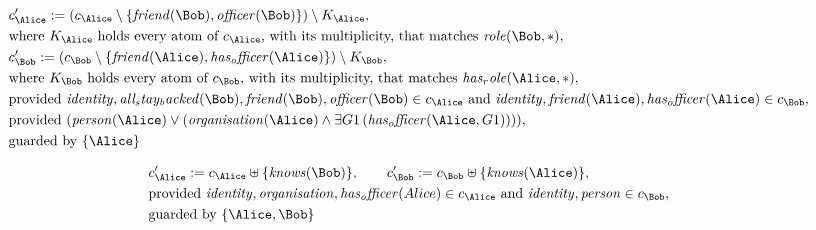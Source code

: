 \begin{align*}
&
c'_
{
\Alice
}
 := 
(c_
{
\Alice
}
 \setminus 
\{
\mathit{
friend
}
(
\Bob
)
,
\mathit{
officer
}
(
\Bob
)
\}
) \setminus K_
{
\Alice
}
,\\
&
\text{where } K_
{
\Alice
}
 \text{ holds every atom of } c_
{
\Alice
}
 \text{, with its multiplicity, that matches } 
\mathit{
role
}
(
\Bob
,
\ast
)
,\\
&
c'_
{
\Bob
}
 := 
(c_
{
\Bob
}
 \setminus 
\{
\mathit{
friend
}
(
\Alice
)
,
\mathit{
has_officer
}
(
\Alice
)
\}
) \setminus K_
{
\Bob
}
,\\
&
\text{where } K_
{
\Bob
}
 \text{ holds every atom of } c_
{
\Bob
}
 \text{, with its multiplicity, that matches } 
\mathit{
has_role
}
(
\Alice
,
\ast
)
,\\
&
\text{provided } 
\mathit{
identity
}
,
\mathit{
all_stay_backed
}
(
\Bob
)
,
\mathit{
friend
}
(
\Bob
)
,
\mathit{
officer
}
(
\Bob
)
 \in c_
{
\Alice
}
 \text{ and } 
\mathit{
identity
}
,
\mathit{
friend
}
(
\Alice
)
,
\mathit{
has_officer
}
(
\Alice
)
 \in c_
{
\Bob
}
,\\
&
\text{provided } 
(
\mathit{
person
}
(
\Alice
)
\lor
(
\mathit{
organisation
}
(
\Alice
)
\land
\exists 
G1
\,(
\mathit{
has_officer
}
(
\Alice
,
G1
)
)
)
)
,\\
&
\text{guarded by } \{
\Alice
\}
\end{align*}

\begin{align*}
&
c'_
{
\Alice
}
 := 
c_
{
\Alice
}
 \uplus 
\{
\mathit{
knows
}
(
\Bob
)
\}
, \qquad 
c'_
{
\Bob
}
 := 
c_
{
\Bob
}
 \uplus 
\{
\mathit{
knows
}
(
\Alice
)
\}
,\\
&
\text{provided } 
\mathit{
identity
}
,
\mathit{
organisation
}
,
\mathit{
has_officer
}
(
Alice
)
 \in c_
{
\Alice
}
 \text{ and } 
\mathit{
identity
}
,
\mathit{
person
}
 \in c_
{
\Bob
}
,\\
&
\text{guarded by } \{
\Alice
,
\Bob
\}
\end{align*}

